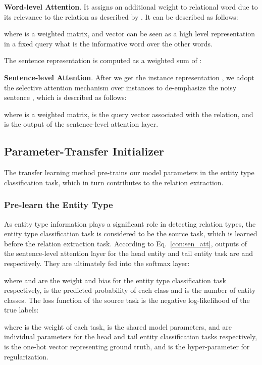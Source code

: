 \documentclass[11pt,a4paper]{article}
\begin{document}
  \textbf{Word-level Attention}. It assigns an additional weight  to relational word  due to its relevance to the relation as described by \citet{zhou2016attention}. It can be described as follows:
  
  where  is a weighted matrix, and vector  can be seen as a high level representation in a fixed query what is the informative word over the other words.
   
  The  sentence representation  is computed as a weighted sum of :
  

  \textbf{Sentence-level Attention}. After we get the instance representation , we adopt the selective attention mechanism over instances to de-emphasize the noisy sentence \citep{lin2016neural}, which is described as follows:
  
  where  is a weighted matrix,  is the query vector associated with the relation, and  is the output of the sentence-level attention layer.

  \subsection{Parameter-Transfer Initializer}
  The transfer learning method pre-trains our model parameters in the entity type classification task, which in turn contributes to the relation extraction.

  \subsubsection*{Pre-learn the Entity Type}
  As entity type information plays a significant role in detecting relation types, the entity type classification task is considered to be the source task, which is learned before the relation extraction task. According to Eq.~\ref{con:sen_att}, outputs of the sentence-level attention layer for the head entity and tail entity task are  and  respectively. They are ultimately fed into the softmax layer:
  
  where  and  are the weight and bias for the entity type classification task respectively,  is the predicted probability of each class and  is the number of entity classes. The loss function of the source task is the negative log-likelihood of the true labels:
  
  where  is the weight of each task,  is the shared model parameters,  and  are individual parameters for the head and tail entity classification tasks respectively,  is the one-hot vector representing ground truth, and  is the hyper-parameter for  regularization.
  
\end{document}
